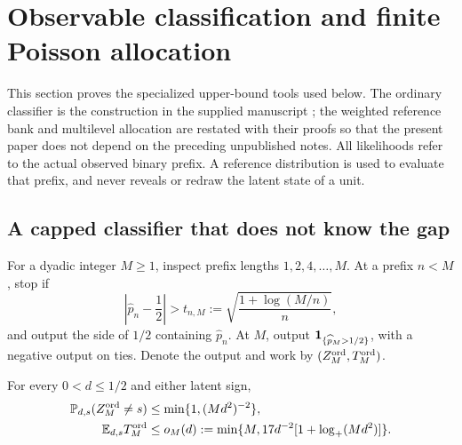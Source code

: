 \section{Observable classification and finite Poisson allocation}
\label{sec:uf-foundations}

This section proves the specialized upper-bound tools used below. The
ordinary classifier is the construction in the supplied manuscript
\cite{original,repo}; the weighted reference bank and multilevel
allocation are restated with their proofs so that the present paper
does not depend on the preceding unpublished notes. All likelihoods
refer to the actual observed binary prefix. A reference distribution
is used to evaluate that prefix, and never reveals or redraw the
latent state of a unit.

\subsection{A capped classifier that does not know the gap}

For a dyadic integer $M\ge1$, inspect prefix lengths
$1,2,4,\ldots,M$. At a prefix $n<M$, stop if
\[
 \left|\widehat p_n-\frac12\right|>
 t_{n,M}:=\sqrt{\frac{1+\log(M/n)}{n}},
\]
and output the side of $1/2$ containing $\widehat p_n$. At $M$, output
$\mathbf 1_{\{\widehat p_M>1/2\}}$, with a negative output on ties.
Denote the output and work by $(Z_M^{\rm ord},T_M^{\rm ord})$.

\begin{lemma}\label{lem:uf-ordinary}
For every $0<d\le1/2$ and either latent sign,
\begin{align}
 \mathbb P_{d,s}(Z_M^{\rm ord}\ne s)
 &\le \min\{1,(Md^2)^{-2}\},\label{eq:uf-ordinary-error}\\
 \mathbb E_{d,s}T_M^{\rm ord}
 &\le o_M(d):=\min\{M,17d^{-2}[1+\log_+(Md^2)]\}.
 \label{eq:uf-ordinary-work}
\end{align}
\end{lemma}

